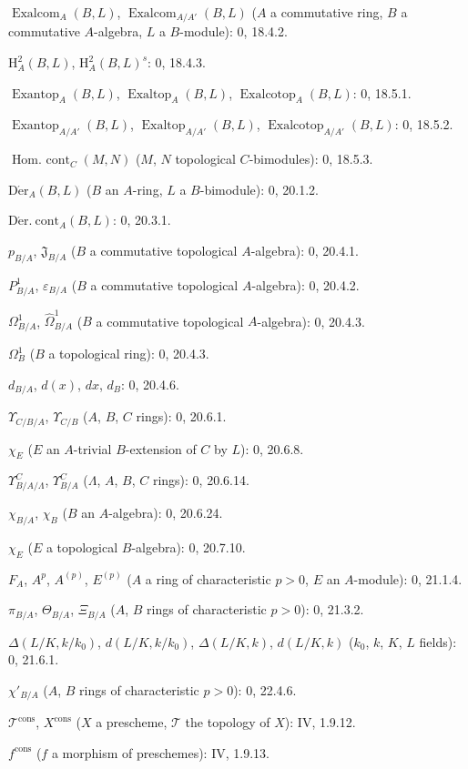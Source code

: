 $\operatorname{Exalcom}_A(B,L)$, $\operatorname{Exalcom}_{A/A'}(B,L)$ ($A$ a commutative ring, $B$ a commutative $A$-algebra, $L$ a $B$-module): 0, 18.4.2.\par
$\mathrm H_A^2(B,L)$, $\mathrm H_A^2(B,L)^s$: 0, 18.4.3.\par
$\operatorname{Exantop}_A(B,L)$, $\operatorname{Exaltop}_A(B,L)$,
$\operatorname{Exalcotop}_A(B,L)$: 0, 18.5.1.\par
$\operatorname{Exantop}_{A/A'}(B,L)$, $\operatorname{Exaltop}_{A/A'}(B,L)$,
$\operatorname{Exalcotop}_{A/A'}(B,L)$: 0, 18.5.2.\par
$\operatorname{Hom.\ cont}_C(M,N)$ ($M$, $N$ topological $C$-bimodules): 0, 18.5.3.\par
$\operatorname{D\acute{e}r}_A(B,L)$ ($B$ an $A$-ring, $L$ a $B$-bimodule): 0, 20.1.2.\par
$\operatorname{D\acute{e}r.\ cont}_A(B,L)$: 0, 20.3.1.\par
$p_{B/A}$, $\mathfrak J_{B/A}$ ($B$ a commutative topological $A$-algebra): 0, 20.4.1.\par
$P^1_{B/A}$, $\varepsilon_{B/A}$ ($B$ a commutative topological $A$-algebra): 0, 20.4.2.\par
$\Omega^1_{B/A}$, $\widehat{\Omega}^1_{B/A}$ ($B$ a commutative topological $A$-algebra): 0, 20.4.3.\par
$\Omega^1_B$ ($B$ a topological ring): 0, 20.4.3.\par
$d_{B/A}$, $d(x)$, $dx$, $d_B$: 0, 20.4.6.\par
$\Upsilon_{C/B/A}$, $\Upsilon_{C/B}$ ($A$, $B$, $C$ rings): 0, 20.6.1.\par
$\chi_E$ ($E$ an $A$-trivial $B$-extension of $C$ by $L$): 0, 20.6.8.\par

\clearpage
{}
$\Upsilon^C_{B/A/\Lambda}$, $\Upsilon^C_{B/A}$ ($\Lambda$, $A$, $B$, $C$ rings): 0, 20.6.14.\par
$\chi_{B/A}$, $\chi_B$ ($B$ an $A$-algebra): 0, 20.6.24.\par
$\chi_E$ ($E$ a topological $B$-algebra): 0, 20.7.10.\par
$F_A$, $A^p$, $A^{(p)}$, $E^{(p)}$ ($A$ a ring of characteristic $p>0$, $E$ an $A$-module): 0, 21.1.4.\par
$\pi_{B/A}$, $\Theta_{B/A}$, $\Xi_{B/A}$ ($A$, $B$ rings of characteristic $p>0$): 0, 21.3.2.\par
$\Delta(L/K,k/k_0)$, $d(L/K,k/k_0)$, $\Delta(L/K,k)$, $d(L/K,k)$ ($k_0$, $k$, $K$, $L$ fields): 0, 21.6.1.\par
$\chi'_{B/A}$ ($A$, $B$ rings of characteristic $p>0$): 0, 22.4.6.\par
$\mathscr T^{\mathrm{cons}}$, $X^{\mathrm{cons}}$ ($X$ a prescheme, $\mathscr T$ the topology of $X$): IV, 1.9.12.\par
$f^{\mathrm{cons}}$ ($f$ a morphism of preschemes): IV, 1.9.13.\par


